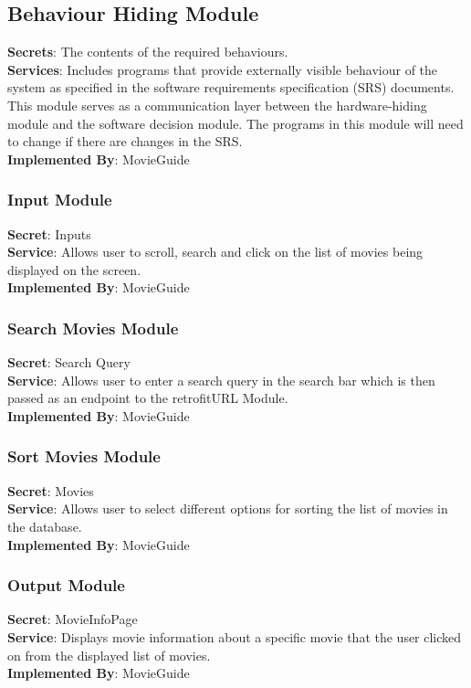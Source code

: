 \documentclass[12pt, titlepage]{article}
\begin{document}
	\subsection{Behaviour Hiding Module}
	\textbf{Secrets}: The contents of the required behaviours. \\
	\textbf{Services}: Includes programs that provide externally visible behaviour of the system as specified in the software requirements specification (SRS) documents. This module serves as a communication layer between the hardware-hiding module and the software decision module. The programs in this module will need to change if there are changes in the SRS.\\
	\textbf{Implemented By}: MovieGuide \\
	\subsubsection{Input Module}
	\textbf{Secret}:  Inputs \\
	\textbf{Service}: Allows user to scroll, search and click on the list of movies being displayed on the screen.   \\  
	\textbf{Implemented By}: MovieGuide \\
	\subsubsection{Search Movies Module}
	\textbf{Secret}: Search Query\\
	\textbf{Service}: Allows user to enter a search query in the search bar which is then passed as an endpoint to the retrofitURL Module. \\
	\textbf{Implemented By}: MovieGuide\\
	\subsubsection{Sort Movies Module}
	\textbf{Secret}: Movies \\
	\textbf{Service}: Allows user to select different options for sorting the list of movies in the database. \\
	\textbf{Implemented By}: MovieGuide\\ 
	\subsubsection{Output Module}
	\textbf{Secret}: MovieInfoPage \\
	\textbf{Service}: Displays movie information about a specific movie that the user clicked on from the displayed list of movies. \\
	\textbf{Implemented By}: MovieGuide\\
	
\end{document}
